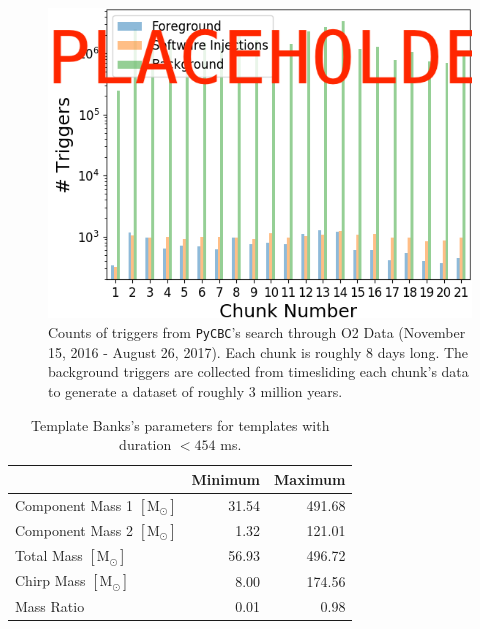 \documentclass[%
 reprint,
 amsmath,amssymb,
 aps,
]{revtex4}
\begin{document}
\begin{figure}[!h]

{\centering \includegraphics[width=0.75\linewidth]{images/O2_unfiltered_trigger_counts} 

}

\caption[Count of all triggers in PyCBC O2 search]{Counts of triggers from \texttt{PyCBC}'s search through O2 Data (November 15, 2016 - August 26, 2017). Each chunk is roughly 8 days long. The background triggers are collected from timesliding each chunk's data to generate a dataset of roughly 3 million years.}\label{fig:o2TrigCount}
\end{figure}


\begin{table}[t]

\caption[BBH parameters corresponding to durations $<454$ ms]{\label{tab:parameters}Template Banks's parameters for templates with duration $<454$ ms.}
\centering
\begin{tabular}{lrr}
\toprule
  & Minimum & Maximum\\
\midrule
Component Mass 1 $[\text{M}_{\odot}]$ & 31.54 & 491.68\\
Component Mass 2 $[\text{M}_{\odot}]$ & 1.32 & 121.01\\
Total Mass $[\text{M}_{\odot}]$ & 56.93 & 496.72\\
Chirp Mass $[\text{M}_{\odot}]$ & 8.00 & 174.56\\
Mass Ratio & 0.01 & 0.98\\
\end{tabular}
\end{table}
\end{document}
